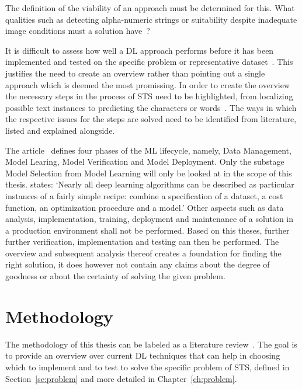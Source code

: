The definition of the viability of an approach must be determined for this.
What qualities such as detecting alpha-numeric strings or suitability despite
inadequate image conditions must a solution have~\citep{ghosh_visual_2017, hu_gtc_2020}?

It is difficult to assess how well a \ac{DL} approach performs before it has been
implemented and tested on the specific problem or representative dataset~\citep{arpteg_software_2018}.
This justifies the need to create an overview rather than pointing out a single approach which is
deemed the most promissing.
In order to create the overview the necessary steps in the process of \ac{STS} need to be highlighted,
from localizing possible text instances to predicting the characters or
words~\citep{long_scene_2021, sourvanos_challenges_2018}.
The ways in which the respective issues for the steps are solved need to be
identified from literature, listed and explained alongside.

The article~\cite{ashmore_assuring_2021} defines four phases of the \ac{ML} lifecycle, namely,
Data Management, Model Learing, Model Verification and Model Deployment.
Only the substage Model Selection from Model Learning will only be looked at in the scope of this
thesis.
\cite{goodfellow_deep_2016} states:
`Nearly all deep learning algorithms can be described as particular instances of a fairly simple
recipe: combine a specification of a dataset, a cost function, an optimization procedure and a model.'
Other aspects such as data analysis, implementation, training, deployment and maintenance of a
solution in a production environment shall not be performed.
Based on this theses, further further verification, implementation and testing can then be performed.
The overview and subsequent analysis thereof creates a foundation for finding the right solution,
it does however not contain any claims about the degree of goodness or about the certainty of
solving the given problem.

\begin{comment}
Abgrenzung für Training NN
- no talk about Setup (preprocessing, weight initialization,regularization)
- No talk about training dynamics (learning rate,large batch training, hyperparameter)
- No after training ( transfer learning, model ensemble)
\end{comment}

\section{Methodology}\label{se:methodology}
The methodology of this thesis can be labeled as a literature review~\citep{snyder_literature_2019,
torraco_writing_2005}.
The goal is to provide an overview over current \ac{DL} techniques that can help in
choosing which to implement and to test to solve the specific problem of \ac{STS}, defined in
Section~\ref{se:problem} and more detailed in Chapter~\ref{ch:problem}.

